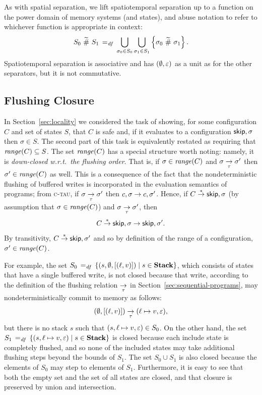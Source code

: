 \documentclass[11pt]{report}
\begin{document}
As with spatial separation, we lift spatiotemporal separation up to a function on the power domain of memory systems (and states), and abuse notation to refer to whichever function is appropriate in context: \[ S_0 \operatorname{\,\widetilde{\#}\,} S_1 \operatorname{\;=_{\mathit{df}}\;} \bigcup_{\sigma_0 \in S_0} \bigcup_{\sigma_1 \in S_1} \left\lbrace \sigma_0 \operatorname{\,\widetilde{\#}\,} \sigma_1 \right\rbrace.\] Spatiotemporal separation is associative and has $(\operatorname{\emptyset},\varepsilon)$ as a unit as for the other separators, but it is not commutative. 


\subsection{Flushing Closure}
\label{sec:uniprocessor-predicates}

In Section~\ref{sec:locality} we considered the task of showing, for some configuration $C$ and set of states $S$, that $C$ is safe and, if it evaluates to a configuration $\operatorname{\mathsf{skip}},\sigma$ then $\sigma \in S$. The second part of this task is equivalently restated as requiring that $\mathit{range}(C) \subseteq S$. The set $\mathit{range}(C)$ has a special structure worth noting: namely, it is \emph{down-closed w.r.t.\ the flushing order}. That is, if $\sigma \in \mathit{range}(C)$ and $\sigma \underset{\tau}{\rightarrow} \sigma'$ then $\sigma' \in \mathit{range}(C)$ as well. This is a consequence of the fact that the nondeterministic flushing of buffered writes is incorporated in the evaluation semantics of programs; from \textsc{c-tau}, if $\sigma \underset{\tau}{\rightarrow} \sigma'$ then $c,\sigma \rightarrow c,\sigma'$. Hence, if $C \stackrel{\ast}{\rightarrow} \operatorname{\mathsf{skip}},\sigma$ (by assumption that $\sigma \in \mathit{range}(C)$) and $\sigma \underset{\tau}{\rightarrow} \sigma'$, then \[ C \stackrel{\ast}{\rightarrow} \operatorname{\mathsf{skip}},\sigma \rightarrow \operatorname{\mathsf{skip}},\sigma'.\] By transitivity, $C \stackrel{\ast}{\rightarrow} \operatorname{\mathsf{skip}},\sigma'$ and so by definition of the range of a configuration, $\sigma' \in \mathit{range}(C)$. 
  
For example, the set $S_0 \operatorname{\;=_{\mathit{df}}\;} \left\lbrace (s,\operatorname{\emptyset},\left[(\ell,v)\right]) \mid s \in \mathbf{Stack} \right\rbrace$, which consists of states that have a single buffered write, is not closed because that write, according to the definition of the flushing relation $\underset{\tau}{\rightarrow}$ in Section~\ref{sec:sequential-programs}, may nondeterministically commit to memory as follows: \[(\operatorname{\emptyset},\left[(\ell,v)\right]) \underset{\tau}{\rightarrow} (\ell \mapsto v,\varepsilon),\] but there is no stack $s$ such that $(s, \ell \mapsto v, \varepsilon) \in S_0$. On the other hand, the set $S_1 \operatorname{\;=_{\mathit{df}}\;} \left\lbrace (s,\ell \mapsto v,\varepsilon) \mid s \in \mathbf{Stack} \right\rbrace$ is closed because each include state is completely flushed, and so none of the included states may take additional flushing steps beyond the bounds of $S_1$. The set $S_0 \cup S_1$ is also closed because the elements of $S_0$ may step to elements of $S_1$. Furthermore, it is easy to see that both the empty set and the set of all states are closed, and that closure is preserved by union and intersection. 
\end{document}
